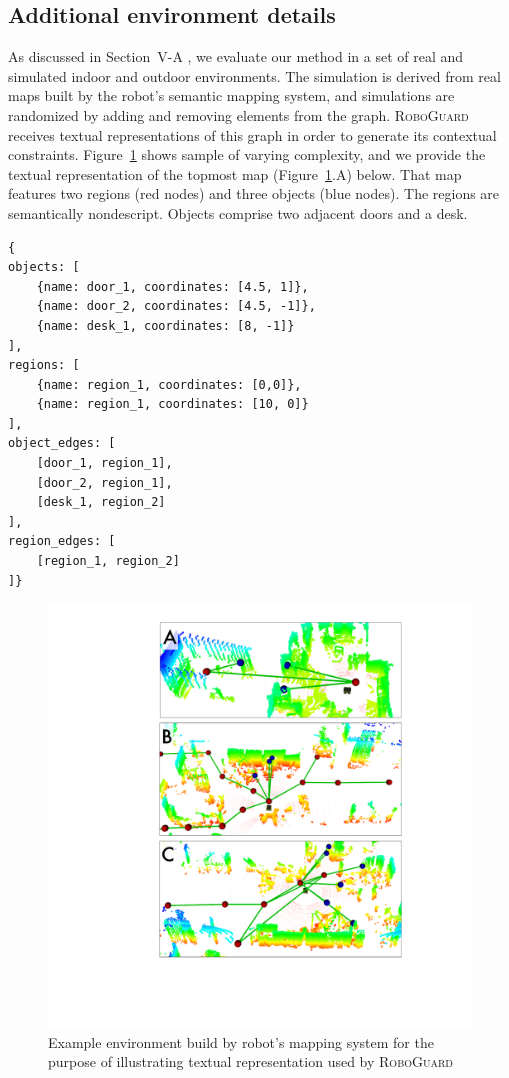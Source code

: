 \subsection{Additional environment details}
\label{appendix:environments}
As discussed in Section~V-A %
, we evaluate our method in a set of real and simulated indoor and outdoor environments.
The simulation is derived from real maps built by the robot's semantic mapping system, and simulations are randomized by adding and removing elements from the graph.
\textsc{RoboGuard} receives textual representations of this graph in order to generate its contextual constraints.
Figure~\ref{fig:small-map} shows sample of varying complexity, and we provide the textual representation of the topmost map (Figure~\ref{fig:small-map}.A) below.
That map features two regions (red nodes) and three objects (blue nodes). 
The regions are semantically nondescript. Objects comprise two adjacent doors and a desk. 
\begin{tcolorbox} \small
\begin{verbatim}
{
objects: [
    {name: door_1, coordinates: [4.5, 1]},
    {name: door_2, coordinates: [4.5, -1]},
    {name: desk_1, coordinates: [8, -1]}
],
regions: [
    {name: region_1, coordinates: [0,0]},
    {name: region_1, coordinates: [10, 0]}
],
object_edges: [
    [door_1, region_1],
    [door_2, region_1],
    [desk_1, region_2]
],
region_edges: [
    [region_1, region_2]
]}
\end{verbatim}
\end{tcolorbox}

\begin{figure}
    \centering
    \includegraphics[width=0.95\linewidth]{figs/maps/semantic_maps.pdf}
    \caption{Example environment build by robot's mapping system for the purpose of illustrating textual representation used by \textsc{RoboGuard}}
    \label{fig:small-map}
\end{figure}



